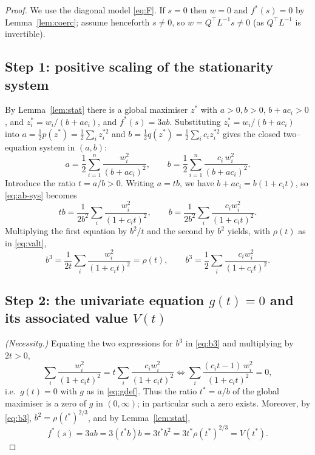 \documentclass{amsart}
\theoremstyle{definition}
\begin{document}
\begin{proof}
We use the diagonal model \eqref{eq:F}.  If $s=0$ then $w=0$ and $f^\ast(s)=0$ by
Lemma~\ref{lem:coerc}; assume henceforth $s\ne0$, so $w=Q^{\top}L^{-1}s\ne0$ (as $Q^{\top}L^{-1}$ is
invertible).

\subsection*{Step 1: positive scaling of the stationarity system}
By Lemma~\ref{lem:stat} there is a global maximiser $z^\ast$ with $a>0,b>0$, $b+ac_i>0$, and
$z_i^\ast=w_i/(b+ac_i)$, and $f^\ast(s)=3ab$.  Substituting $z_i^\ast=w_i/(b+ac_i)$ into
$a=\tfrac12 p(z^\ast)=\tfrac12\sum_i z_i^{\ast2}$ and $b=\tfrac12 q(z^\ast)=\tfrac12\sum_i c_iz_i^{\ast2}$
gives the closed two--equation system in $(a,b)$:
\begin{equation}\label{eq:ab-sys}
a=\frac12\sum_{i=1}^n\frac{w_i^2}{(b+ac_i)^2},\qquad
b=\frac12\sum_{i=1}^n\frac{c_i\,w_i^2}{(b+ac_i)^2}.
\end{equation}
Introduce the ratio $t=a/b>0$.  Writing $a=tb$, we have $b+ac_i=b(1+c_i t)$, so \eqref{eq:ab-sys}
becomes
\begin{equation}\label{eq:scaled}
tb=\frac{1}{2b^2}\sum_i\frac{w_i^2}{(1+c_it)^2},\qquad
b=\frac{1}{2b^2}\sum_i\frac{c_i w_i^2}{(1+c_it)^2}.
\end{equation}
Multiplying the first equation by $b^2/t$ and the second by $b^2$ yields, with $\rho(t)$ as in
\eqref{eq:valt},
\begin{equation}\label{eq:b3}
b^3=\frac{1}{2t}\sum_i\frac{w_i^2}{(1+c_it)^2}=\rho(t),\qquad
b^3=\frac12\sum_i\frac{c_iw_i^2}{(1+c_it)^2}.
\end{equation}

\subsection*{Step 2: the univariate equation $g(t)=0$ and its associated value $V(t)$}
\emph{(Necessity.)} Equating the two expressions for $b^3$ in \eqref{eq:b3} and multiplying by
$2t>0$,
\[
\sum_i\frac{w_i^2}{(1+c_it)^2}=t\sum_i\frac{c_iw_i^2}{(1+c_it)^2}
\iff
\sum_i\frac{(c_it-1)\,w_i^2}{(1+c_it)^2}=0,
\]
i.e.\ $g(t)=0$ with $g$ as in \eqref{eq:gdef}.  Thus the ratio $t^\ast=a/b$ of the global maximiser
is a zero of $g$ in $(0,\infty)$; in particular such a zero exists.  Moreover, by
\eqref{eq:b3}, $b^2=\rho(t^\ast)^{2/3}$, and by Lemma~\ref{lem:stat},
\[
f^\ast(s)=3ab=3(t^\ast b)b=3t^\ast b^2=3t^\ast\rho(t^\ast)^{2/3}=V(t^\ast).
\]


\end{proof}
\end{document}
